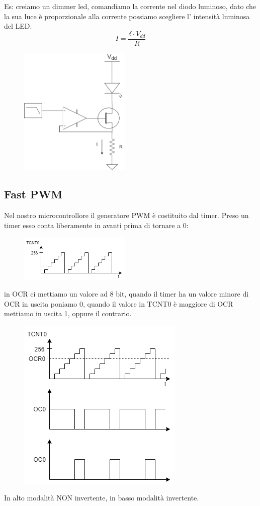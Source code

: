 Es: creiamo un dimmer led, comandiamo la corrente nel diodo luminoso, dato che la sua luce è proporzionale alla corrente possiamo scegliere l' intensità luminosa del LED.
$$ I = \frac{\delta \cdot V_{dd}}{R} $$
\begin{figure}[H]
    \centering
    \includegraphics[width=200px]{images/19_PWM/pwm_led_dimmer.png}
\end{figure}

\subsection{Fast PWM}
Nel nostro microcontrollore il generatore PWM è costituito dal timer.
Preso un timer esso conta liberamente in avanti prima di tornare a 0:
\begin{figure}[H]
    \centering
    \includegraphics[width=200px]{images/19_PWM/fast_pwm_tcnt.png}
\end{figure}
in OCR ci mettiamo un valore ad 8 bit, quando il timer ha un valore minore di OCR in uscita poniamo 0, quando il valore in TCNT0 è maggiore di OCR mettiamo in uscita 1, oppure il contrario.
\begin{figure}[H]
    \centering
    \includegraphics{images/19_PWM/non_inverting-inverting_fast_pwm.png}
\end{figure}
In alto modalità NON invertente, in basso modalità invertente.

